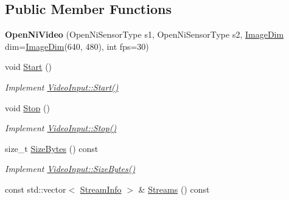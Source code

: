 \subsection*{Public Member Functions}
\begin{DoxyCompactItemize}
\item 
{\bfseries Open\+Ni\+Video} (Open\+Ni\+Sensor\+Type s1, Open\+Ni\+Sensor\+Type s2, \hyperlink{structpangolin_1_1_image_dim}{Image\+Dim} dim=\hyperlink{structpangolin_1_1_image_dim}{Image\+Dim}(640, 480), int fps=30)\hypertarget{structpangolin_1_1_open_ni_video_a6d93fba2bcd7dbe988d572eda98a47ab}{}\label{structpangolin_1_1_open_ni_video_a6d93fba2bcd7dbe988d572eda98a47ab}

\item 
void \hyperlink{structpangolin_1_1_open_ni_video_af77e72402c088527c11d663b2ebaee90}{Start} ()\hypertarget{structpangolin_1_1_open_ni_video_af77e72402c088527c11d663b2ebaee90}{}\label{structpangolin_1_1_open_ni_video_af77e72402c088527c11d663b2ebaee90}

\begin{DoxyCompactList}\small\item\em Implement \hyperlink{structpangolin_1_1_video_input_a74a2e3e1b87c7cbf9de9bcb39e1df128}{Video\+Input\+::\+Start()} \end{DoxyCompactList}\item 
void \hyperlink{structpangolin_1_1_open_ni_video_a8435ecba39ae1d7b9372580a68be8a51}{Stop} ()\hypertarget{structpangolin_1_1_open_ni_video_a8435ecba39ae1d7b9372580a68be8a51}{}\label{structpangolin_1_1_open_ni_video_a8435ecba39ae1d7b9372580a68be8a51}

\begin{DoxyCompactList}\small\item\em Implement \hyperlink{structpangolin_1_1_video_input_a8945f80194cc7ec9594db7f27e7d09b8}{Video\+Input\+::\+Stop()} \end{DoxyCompactList}\item 
size\+\_\+t \hyperlink{structpangolin_1_1_open_ni_video_ad58408c831e7e1ed900dc99dcd4b9cf7}{Size\+Bytes} () const \hypertarget{structpangolin_1_1_open_ni_video_ad58408c831e7e1ed900dc99dcd4b9cf7}{}\label{structpangolin_1_1_open_ni_video_ad58408c831e7e1ed900dc99dcd4b9cf7}

\begin{DoxyCompactList}\small\item\em Implement \hyperlink{structpangolin_1_1_video_input_a93cee5c33386973a2a51165e6bdcf40b}{Video\+Input\+::\+Size\+Bytes()} \end{DoxyCompactList}\item 
const std\+::vector$<$ \hyperlink{classpangolin_1_1_stream_info}{Stream\+Info} $>$ \& \hyperlink{structpangolin_1_1_open_ni_video_a8084e7beefb248703b1667a4d940d8b4}{Streams} () const \hypertarget{structpangolin_1_1_open_ni_video_a8084e7beefb248703b1667a4d940d8b4}{}\label{structpangolin_1_1_open_ni_video_a8084e7beefb248703b1667a4d940d8b4}


\end{DoxyCompactItemize}

